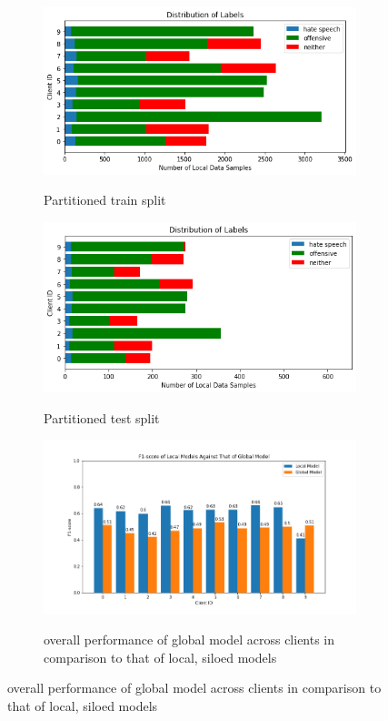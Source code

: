 \documentclass[letterpaper]{article} %
\begin{document}
\begin{figure}[h]

\begin{subfigure}{\columnwidth}
{\includegraphics[width=\columnwidth]{noniid-distribution-based-label-imbalance_distribution_of_labels_2}}
\caption{Partitioned train split}
\end{subfigure}

\begin{subfigure}{\columnwidth}
{\includegraphics[width=\columnwidth]{noniid-distribution-based-label-imbalance_test_set_distribution_of_labels_2}}
\caption{Partitioned test split}
\end{subfigure}

\begin{subfigure}{\columnwidth}
{\includegraphics[width=\columnwidth]{noniid-distribution-based-label-imbalance_seed_2performance_of_models_on_client_data_f1score}}
\caption{overall performance of global model across clients in comparison to that of local, siloed models}
\end{subfigure}


\end{figure}
\end{document}
